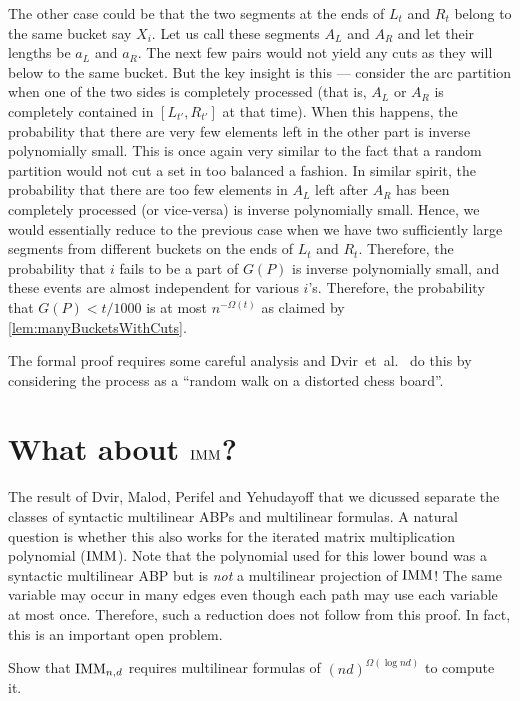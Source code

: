 The other case could be that the two segments at the ends of $L_t$ and $R_t$ belong to the same bucket say $X_i$.
Let us call these segments $A_L$ and $A_R$ and let their lengths be $a_L$ and $a_R$.
The next few pairs would not yield any cuts as they will below to the same bucket.
But the key insight is this --- consider the arc partition when one of the two sides is completely processed (that is, $A_L$ or $A_R$ is completely contained in $[L_{t'},R_{t'}]$ at that time).
When this happens, the probability that there are very few elements left in the other part is inverse polynomially small.
This is once again very similar to the fact that a random partition would not cut a set in too balanced a fashion.
In similar spirit, the probability that there are too few elements in $A_L$ left after $A_R$ has been completely processed (or vice-versa) is inverse polynomially small.
Hence, we would essentially reduce to the previous case when we have two sufficiently large segments from different buckets on the ends of $L_t$ and $R_t$.
Therefore, the probability that $i$ fails to be a part of $G(P)$ is inverse polynomially small, and these events are almost independent for various $i$'s.
Therefore, the probability that $G(P) < t/1000$ is at most $n^{-\Omega(t)}$ as claimed by \autoref{lem:manyBucketsWithCuts}.


The formal proof requires some careful analysis and Dvir~et~al.~\cite{dmpy12} do this by considering the process as a ``random walk on a distorted chess board''. 

\section{What about $\operatorname{\mathrm{IMM}}$?}

The result of Dvir, Malod, Perifel and Yehudayoff \cite{dmpy12} that we dicussed separate the classes of syntactic multilinear ABPs and multilinear formulas.
A natural question is whether this also works for the iterated matrix multiplication polynomial ($\operatorname{\mathrm{IMM}}$).
Note that the polynomial used for this lower bound was a syntactic multilinear ABP but is \emph{not} a multilinear projection of $\operatorname{\mathrm{IMM}}$!
The same variable may occur in many edges even though each path may use each variable at most once.
Therefore, such a reduction does not follow from this proof.
In fact, this is an important open problem.

\begin{openproblem}
  Show that $\operatorname{\mathrm{IMM}}_{n,d}$ requires  multilinear formulas of $(nd)^{\Omega(\log nd)}$ to compute it. 
\end{openproblem}


